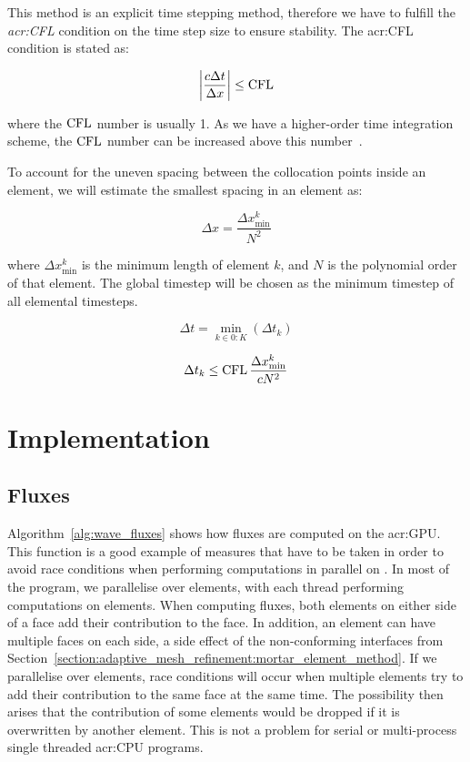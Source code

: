 This method is an explicit time stepping method, therefore we have to fulfill the
\textit{\acrfull{acr:CFL}} condition on the time step size to ensure stability. The
\acrshort{acr:CFL} condition is stated as:

\begin{equation}
    \left| \frac{c \Delta t}{\Delta x} \right| \leq \operatorname{CFL}
\end{equation}

\noindent
where the \(\operatorname{CFL} \) number is usually 1. As we have a higher-order time integration scheme, the
\(\operatorname{CFL} \) number can be increased above this number~\cite{Gottlieb2001}.

To account for the uneven spacing between the collocation points inside an element, we will estimate
the smallest spacing in an element as: 

\begin{equation}
    \Delta x = \frac{\Delta x^k_{\min}}{N^2}
\end{equation}

\noindent
where \(\Delta x^k_{\min}\) is the minimum length of element \(k\), and \(N\) is the polynomial
order of that element. The global timestep will be chosen as the minimum timestep of all elemental
timesteps. 

\begin{equation}
    \Delta t = \min_{k \in 0:K} \left( \Delta t_k \right)
\end{equation}

\begin{equation}
    \Delta t_k \leq \operatorname{CFL} \frac{\Delta x^k_{\min}}{cN^2}
\end{equation}

\section{Implementation}\label{section:spectral_element_method:implementation}

\subsection{Fluxes}\label{subsection:spectral_element_method:implementation:fluxes}

Algorithm~\ref{alg:wave_fluxes} shows how fluxes are computed on the \acrshort{acr:GPU}. This
function is a good example of measures that have to be taken in order to avoid race conditions when
performing computations in parallel on . In most of the program, we parallelise
over elements, with each thread performing computations on elements. When computing fluxes, both
elements on either side of a face add their contribution to the face. In addition, an element can
have multiple faces on each side, a side effect of the non-conforming interfaces from
Section~\ref{section:adaptive_mesh_refinement:mortar_element_method}. If we parallelise over
elements, race conditions will occur when multiple elements try to add their contribution to the
same face at the same time. The possibility then arises that the contribution of some elements would
be dropped if it is overwritten by another element. This is not a problem for serial or
multi-process single threaded \acrshort{acr:CPU} programs.

